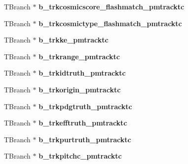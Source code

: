 \begin{DoxyCompactItemize}
\item 
\hypertarget{classanatree_aee0d6ae30f16a0c87abc5667b3105853}{T\-Branch $\ast$ {\bfseries b\-\_\-trkcosmicscore\-\_\-flashmatch\-\_\-pmtracktc}}\label{classanatree_aee0d6ae30f16a0c87abc5667b3105853}

\item 
\hypertarget{classanatree_a07f8f80d4f4af81e0ee35a2980edc14b}{T\-Branch $\ast$ {\bfseries b\-\_\-trkcosmictype\-\_\-flashmatch\-\_\-pmtracktc}}\label{classanatree_a07f8f80d4f4af81e0ee35a2980edc14b}

\item 
\hypertarget{classanatree_a24d7d9999c145731a75bc9d9b44ba992}{T\-Branch $\ast$ {\bfseries b\-\_\-trkke\-\_\-pmtracktc}}\label{classanatree_a24d7d9999c145731a75bc9d9b44ba992}

\item 
\hypertarget{classanatree_a609f2fc9fbce7c97821e45c8f63d7cba}{T\-Branch $\ast$ {\bfseries b\-\_\-trkrange\-\_\-pmtracktc}}\label{classanatree_a609f2fc9fbce7c97821e45c8f63d7cba}

\item 
\hypertarget{classanatree_ad525724bfceba035cd26eb4deef49e04}{T\-Branch $\ast$ {\bfseries b\-\_\-trkidtruth\-\_\-pmtracktc}}\label{classanatree_ad525724bfceba035cd26eb4deef49e04}

\item 
\hypertarget{classanatree_a0ad0f7bddd5f1b4397dda164e4042cc2}{T\-Branch $\ast$ {\bfseries b\-\_\-trkorigin\-\_\-pmtracktc}}\label{classanatree_a0ad0f7bddd5f1b4397dda164e4042cc2}

\item 
\hypertarget{classanatree_a482a9f08a15526c82c270fac97fb9623}{T\-Branch $\ast$ {\bfseries b\-\_\-trkpdgtruth\-\_\-pmtracktc}}\label{classanatree_a482a9f08a15526c82c270fac97fb9623}

\item 
\hypertarget{classanatree_a99f25dcf1c3d8664b11be0fd24ad3f5c}{T\-Branch $\ast$ {\bfseries b\-\_\-trkefftruth\-\_\-pmtracktc}}\label{classanatree_a99f25dcf1c3d8664b11be0fd24ad3f5c}

\item 
\hypertarget{classanatree_a932c2b2b4bb0861154fadb276ccc8564}{T\-Branch $\ast$ {\bfseries b\-\_\-trkpurtruth\-\_\-pmtracktc}}\label{classanatree_a932c2b2b4bb0861154fadb276ccc8564}

\item 
\hypertarget{classanatree_aaaef94e829eba30dd51c239035fd9efc}{T\-Branch $\ast$ {\bfseries b\-\_\-trkpitchc\-\_\-pmtracktc}}\label{classanatree_aaaef94e829eba30dd51c239035fd9efc}


\end{DoxyCompactItemize}
